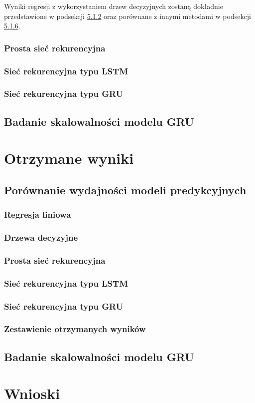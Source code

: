 \documentclass[10pt,a4paper]{article}
\begin{document}
Wyniki regresji z wykorzystaniem drzew decyzyjnych zostaną dokładnie przedstawione w podsekcji \hyperlink{5.1.2}{5.1.2} oraz porównane z innymi metodami w podsekcji \hyperlink{5.1.6}{5.1.6}.

\subsubsection{Prosta sieć rekurencyjna}
\subsubsection{Sieć rekurencyjna typu LSTM}
\subsubsection{Sieć rekurencyjna typu GRU}
\subsection{Badanie skalowalności modelu GRU}

\section{Otrzymane wyniki}
\subsection{Porównanie wydajności modeli predykcyjnych}
\subsubsection{Regresja liniowa}
\subsubsection{Drzewa decyzyjne}
\subsubsection{Prosta sieć rekurencyjna}
\subsubsection{Sieć rekurencyjna typu LSTM}
\subsubsection{Sieć rekurencyjna typu GRU}
\subsubsection{Zestawienie otrzymanych wyników}
\subsection{Badanie skalowalności modelu GRU}

\section{Wnioski}

\printbibliography
\end{document}
